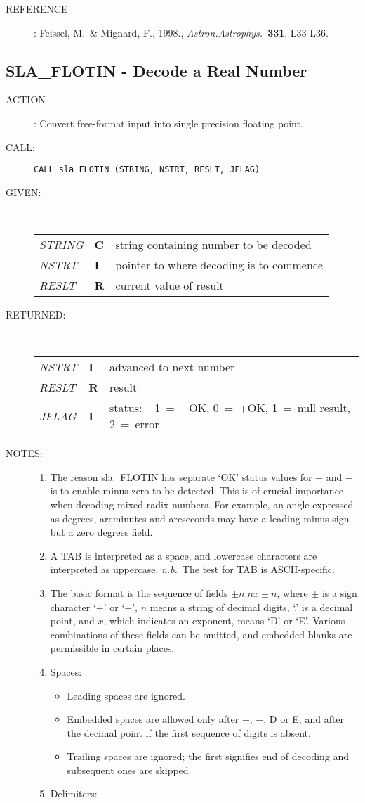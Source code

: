 \documentclass[11pt,twoside]{article}
\newcommand{\xlabel}[1]{}
\newcommand{\routine}[3]
{\hbadness=10000
  \vbox
  {
    \rule{\textwidth}{0.3mm}\\
    {\Large {\bf #1} \hfill #2 \hfill {\bf #1}}\\
    \setlength{\oldspacing}{\topsep}
    \setlength{\topsep}{0.3ex}
    \begin{description}
      #3
    \end{description}
    \setlength{\topsep}{\oldspacing}
  }
}
\renewcommand{\routine}[3]
   {
      \subsection{#1\xlabel{#1} - #2\label{#1}}
       \begin{description}
         #3
       \end{description}
   }
\newcommand{\action}[1]
{\item[ACTION]: #1}
\newcommand{\action}[1]
   {\item[ACTION:] #1}
\newcommand{\call}[1]
{\item[CALL]: \hspace{0.4em}{\tt #1}}
\newlength{\oldspacing}
\renewcommand{\call}[1]
   {
    \item[CALL:] {\tt #1}
   }
\newcommand{\args}[2]
{
  \goodbreak
  \setlength{\oldspacing}{\topsep}
  \setlength{\topsep}{0.3ex}
  \begin{description}
  \item[#1]:\\[1.5ex]
    \begin{tabular}{p{7em}p{6em}p{22em}}
      #2
    \end{tabular}
  \end{description}
  \setlength{\topsep}{\oldspacing}
}
\renewcommand{\args}[2]
   {
     \begin{description}
        \item[#1:]\\
        \begin{tabular}{p{7em}p{6em}l}
           #2
        \end{tabular}
     \end{description}
   }
\newcommand{\spec}[3]
{
  {\em {#1}} & {\bf \mbox{#2}} & {#3}
}
\newcommand{\notes}[1]
{
  \goodbreak
  \setlength{\oldspacing}{\topsep}
  \setlength{\topsep}{0.3ex}
  \begin{description}
    \item[NOTES]:
        #1
  \end{description}
  \setlength{\topsep}{\oldspacing}
}
\renewcommand{\notes}[1]
   {
      \begin{description}
         \item[NOTES:]
            #1
      \end{description}
   }
\newcommand{\aref}[1]
{
  \goodbreak
  \setlength{\oldspacing}{\topsep}
  \setlength{\topsep}{0.3ex}
  \begin{description}
    \item[REFERENCE]:
        #1
  \end{description}
  \setlength{\topsep}{\oldspacing}
}
\newcommand{\aref}[1]
   {
     \begin{description}
       \item[REFERENCE:]
           #1
     \end{description}
   }
\begin{document}
\aref {Feissel, M.\ \& Mignard, F., 1998.,  {\it Astron.Astrophys.}\
       {\bf 331}, L33-L36.}
\routine{SLA\_FLOTIN}{Decode a Real Number}
{
 \action{Convert free-format input into single precision floating point.}
 \call{CALL sla\_FLOTIN (STRING, NSTRT, RESLT, JFLAG)}
}
\args{GIVEN}
{
 \spec{STRING}{C}{string containing number to be decoded} \\
 \spec{NSTRT}{I}{pointer to where decoding is to commence} \\
 \spec{RESLT}{R}{current value of result}
}
\args{RETURNED}
{
 \spec{NSTRT}{I}{advanced to next number} \\
 \spec{RESLT}{R}{result} \\
 \spec{JFLAG}{I}{status: $-$1~=~$-$OK, 0~=~+OK, 1~=~null result, 2~=~error}
}
\notes
{
 \begin{enumerate}
 \item The reason sla\_FLOTIN has separate `OK' status values
       for + and $-$ is to enable minus zero to be detected.
       This is of crucial importance
       when decoding mixed-radix numbers.  For example, an angle
       expressed as degrees, arcminutes and arcseconds may have a
       leading minus sign but a zero degrees field.
 \item A TAB is interpreted as a space, and lowercase characters are
       interpreted as uppercase.  {\it n.b.}\ The test for TAB is
       ASCII-specific.
 \item The basic format is the sequence of fields $\pm n.n x \pm n$,
       where $\pm$ is a sign
       character `+' or `$-$', $n$ means a string of decimal digits,
       `.' is a decimal point, and $x$, which indicates an exponent,
       means `D' or `E'.  Various combinations of these fields can be
       omitted, and embedded blanks are permissible in certain places.
 \item Spaces:
       \begin{itemize}
       \item Leading spaces are ignored.
       \item Embedded spaces are allowed only after +, $-$, D or E,
             and after the decimal point if the first sequence of
             digits is absent.
       \item Trailing spaces are ignored;  the first signifies
             end of decoding and subsequent ones are skipped.
       \end{itemize}
 \item Delimiters:

\end{enumerate}}
\end{document}
